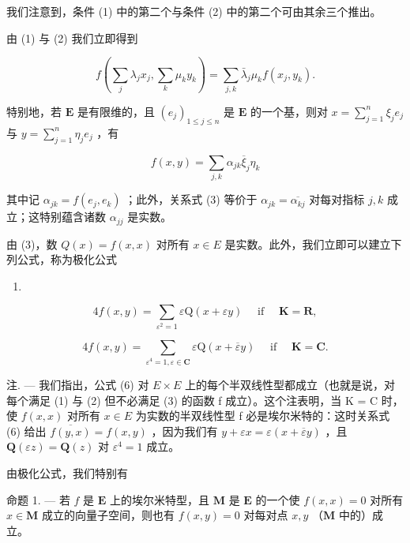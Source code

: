 我们注意到，条件 (1) 中的第二个与条件 (2) 中的第二个可由其余三个推出。

由 (1) 与 (2) 我们立即得到

\[
f \left(\sum_ {j} \lambda_ {j} x _ {j}, \sum_ {k} \mu_ {k} y _ {k}\right) = \sum_ {j, k} \bar {\lambda} _ {j} \mu_ {k} f \left(x _ {j}, y _ {k}\right).\tag{4}
\]

特别地，若 \(\mathbf{E}\) 是有限维的，且 \((e_j)_{1 \leqslant j \leqslant n}\) 是 \(\mathbf{E}\) 的一个基，则对 \(x = \sum_{j=1}^{n} \xi_j e_j\) 与 \(y = \sum_{j=1}^{n} \eta_j e_j\) ，有

\[
f (x, y) = \sum_ {j, k} \alpha_ {j k} \overline {{{{\xi}}}} _ {j} \eta_ {k}
\]

其中记 \(\alpha_{jk} = f(e_j, e_k)\) ；此外，关系式 (3) 等价于 \(\alpha_{jk} = \overline{\alpha_{kj}}\) 对每对指标 \(j, k\) 成立；这特别蕴含诸数 \(\alpha_{jj}\) 是实数。

由 (3)，数 \(Q(x) = f(x, x)\) 对所有 \(x \in E\) 是实数。此外，我们立即可以建立下列公式，称为极化公式

\begin{enumerate}
\def\labelenumi{(\arabic{enumi})}
\setcounter{enumi}{4}
\tightlist
\item
\end{enumerate}

\[
4 f (x, y) = \sum_ {\varepsilon^ {2} = 1} \varepsilon \mathrm{Q} (x + \varepsilon y) \quad \text { if } \quad \mathbf {K} = \mathbf {R},\tag{6}
\]

\[
4 f (x, y) = \sum_ {\varepsilon^ {4} = 1, \varepsilon \in \mathbf {C}} \varepsilon \mathrm{Q} (x + \overline {{{\varepsilon}}} y) \quad \text { if } \quad \mathbf {K} = \mathbf {C}.
\]

注. --- 我们指出，公式 (6) 对 \(E \times E\) 上的每个半双线性型都成立（也就是说，对每个满足 (1) 与 (2) 但不必满足 (3) 的函数 f 成立）。这个注表明，当 K = C 时，使 \(f(x, x)\) 对所有 \(x \in E\) 为实数的半双线性型 f 必是埃尔米特的：这时关系式 (6) 给出 \(\overline{f(y, x)} = f(x, y)\) ，因为我们有 \(y + \varepsilon x = \varepsilon(x + \overline{\varepsilon}y)\) ，且 \(\mathbf{Q}(\varepsilon z) = \mathbf{Q}(z)\) 对 \(\varepsilon^{4} = 1\) 成立。

由极化公式，我们特别有

命题 1. --- 若 \(f\) 是 \(\mathbf{E}\) 上的埃尔米特型，且 \(\mathbf{M}\) 是 \(\mathbf{E}\) 的一个使 \(f(x, x) = 0\) 对所有 \(x \in \mathbf{M}\) 成立的向量子空间，则也有 \(f(x, y) = 0\) 对每对点 \(x, y\) （\(\mathbf{M}\) 中的）成立。


